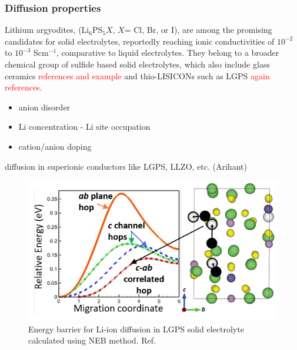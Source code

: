 \documentclass[journal=jacsat,manuscript=article]{achemso}
\newcommand{\re}[1]{\textcolor{red}{#1}}
\begin{document}
\subsubsection{Diffusion properties}


Lithium argyodites, (Li$_6$PS$_{5}X$, $X$= Cl, Br, or I), are among the promising candidates for solid electrolytes, reportedly reaching ionic conductivities of $10^{-2}$ to $10^{-3}$ Scm$^{-1}$, comparative to liquid electrolytes. \cite{deiseroth_li6ps5x_2008} They belong to a broader chemical group of sulfide based solid electrolytes, which also include glass ceramics \re{references and example} and thio-LISICONs such as LGPS \re{again references}.

\begin{itemize}
    \item anion disorder
    \item Li concentration - Li site occupation
    \item cation/anion doping
\end{itemize}
\newline
\newline


diffusion in superionic conductors like LGPS,\cite{Bhandari2016} LLZO, etc. (Arihant)
\begin{figure}
    \centering
    \includegraphics[scale=1.2]{figures/lgps.png}
    \caption{Energy barrier for Li-ion diffusion in LGPS solid electrolyte calculated using NEB method. Ref. }
    \label{fig:my_label}
\end{figure}


\end{document}
